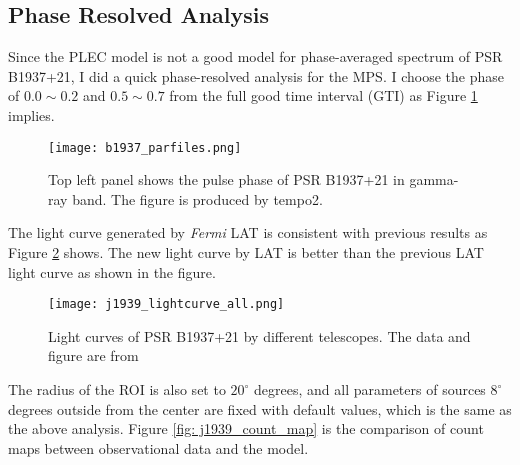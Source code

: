 \documentclass[a4paper, 12pt]{report}
\begin{document}
    \subsection{Phase Resolved Analysis}
      Since the PLEC model is not a good model for phase-averaged spectrum of 
      PSR B1937+21, I did a quick phase-resolved analysis for the MPS. I choose the 
      phase of $0.0 \sim 0.2$ and $0.5 \sim 0.7$ from the full good time interval (GTI) as 
      Figure \ref{fig: j1939_phase} implies. 
      \begin{figure}[!htp]
        \centering 
        \texttt{[image: b1937\_parfiles.png]}
        \caption{Top left panel shows the pulse phase of PSR B1937+21 in gamma-ray band. 
          The figure is produced by tempo2.}
        \label{fig: j1939_phase}
      \end{figure}

      The light curve generated by \textit{Fermi} LAT is consistent with previous results 
      \citep{J1939_old} as Figure \ref{fig: j1939_light_curve_compare} shows. 
      The new light curve by LAT is better than the previous LAT light curve
      as shown in the figure. 

      \begin{figure}
        \centering 
        \texttt{[image: j1939\_lightcurve\_all.png]}
        \caption{Light curves of PSR B1937+21 by different telescopes. The data and figure
          are from \citet{J1939_old}}
        \label{fig: j1939_light_curve_compare}
      \end{figure}


      The radius of the ROI is also set to $20^{\circ}$ degrees, and all parameters of 
      sources $8^{\circ}$ degrees outside from the center are fixed with default values, 
      which is the same as the above analysis. 
      Figure \ref{fig: j1939_count_map} is the comparison of count maps between 
      observational data and the model.
\end{document}
